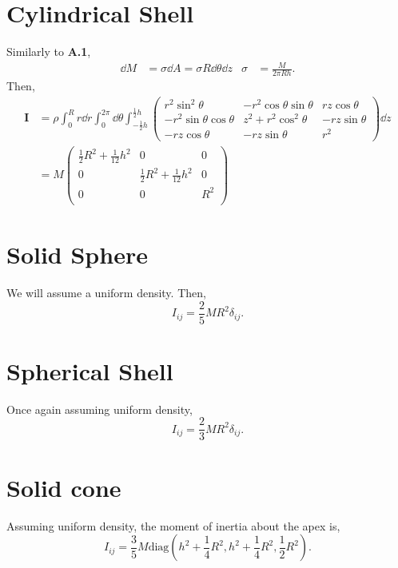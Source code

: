 \documentclass{book}
\begin{document}
\section{Cylindrical Shell}
Similarly to \textbf{A.1},
\begin{align}
    \dd{M} & = \sigma \dd{A} = \sigma R \dd{\theta}\dd{z} & \sigma & = \frac{M}{2\pi R h}. 
\end{align}
Then,
\begin{equation}
\begin{split}
    \mathbf{I} & = \rho\int_0^Rr\dd{r}\int_0^{2\pi}\dd{\theta} \int_{-\frac{1}{2}h}^{\frac{1}{2}h}\begin{pmatrix}
        r^2\sin^2\theta & -r^2\cos\theta\sin\theta & rz\cos\theta \\
        -r^2\sin\theta\cos\theta & z^2 + r^2\cos^2\theta & -rz\sin\theta \\
        -rz\cos\theta & -rz\sin\theta & r^2
    \end{pmatrix}\dd{z}
     \\
    & = M\begin{pmatrix}
        \frac{1}{2}R^2 + \frac{1}{12}h^2 & 0 & 0\\
        0 & \frac{1}{2}R^2 + \frac{1}{12}h^2 & 0 \\
        0 & 0 & R^2 \\
    \end{pmatrix}
\end{split}
\end{equation}
\section{Solid Sphere}
We will assume a uniform density. Then,
\begin{equation}
    I_{ij} = \frac{2}{5}MR^2\delta_{ij}.
\end{equation}
\section{Spherical Shell}
Once again assuming uniform density,
\begin{equation}
    I_{ij} = \frac{2}{3}MR^2\delta_{ij}.
\end{equation}
\section{Solid cone}
Assuming uniform density, the moment of inertia about the apex is,
\begin{equation}
    I_{ij} = \frac{3}{5}M\text{diag}\left(h^2+\frac{1}{4}R^2,h^2+\frac{1}{4}R^2,\frac{1}{2}R^2\right).
\end{equation}
\end{document}
